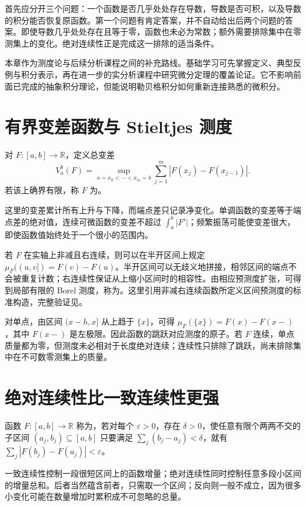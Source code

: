 \documentclass[UTF8,12pt,a4paper,fontset=fandol]{ctexbook}
\begin{document}
首先应分开三个问题：一个函数是否几乎处处存在导数，导数是否可积，以及导数的积分能否恢复原函数。第一个问题有肯定答案，并不自动给出后两个问题的答案。即使导数几乎处处存在且等于零，函数也未必为常数；额外需要排除集中在零测集上的变化。绝对连续性正是完成这一排除的适当条件。

本章作为测度论与后续分析课程之间的补充路线。基础学习可先掌握定义、典型反例与积分表示，再在进一步的实分析课程中研究微分定理的覆盖论证。它不影响前面已完成的抽象积分理论，但能说明勒贝格积分如何重新连接熟悉的微积分。

\section{有界变差函数与 Stieltjes 测度}
\begin{definition}
对 $F:[a,b]\to\mathbb R$，定义总变差
\[
 V_a^b(F)=\sup_{a=x_0<\cdots<x_m=b}
 \sum_{j=1}^{m}|F(x_j)-F(x_{j-1})|.
\]
若该上确界有限，称 $F$ 为。
\end{definition}
这里的变差累计所有上升与下降，而端点差只记录净变化。单调函数的变差等于端点差的绝对值，连续可微函数的变差不超过 $\int_a^b|F'|$；频繁振荡可能使变差很大，即使函数值始终处于一个很小的范围内。

若 $F$ 在实轴上非减且右连续，则可以在半开区间上规定
$\mu_F((u,v])=F(v)-F(u)$。半开区间可以无歧义地拼接，相邻区间的端点不会被重复计数；右连续性保证从上缩小区间时的相容性。由相应预测度扩张，可得到局部有限的 Borel 测度，称为。这里引用非减右连续函数所定义区间预测度的标准构造，完整验证见\cite[第1章]{teschl-ra}。

对单点，由区间 $(x-h,x]$ 从上趋于 $\{x\}$，可得
$\mu_F(\{x\})=F(x)-F(x-)$，其中 $F(x-)$ 是左极限。因此函数的跳跃对应测度的原子。若 $F$ 连续，单点质量都为零，但测度未必相对于长度绝对连续；连续性只排除了跳跃，尚未排除集中在不可数零测集上的质量。

\section{绝对连续性比一致连续性更强}
\begin{definition}
函数 $F:[a,b]\to\mathbb R$ 称为，若对每个 $\varepsilon>0$，存在 $\delta>0$，使任意有限个两两不交的子区间 $(a_j,b_j)\subseteq[a,b]$ 只要满足 $\sum_j(b_j-a_j)<\delta$，就有
$\sum_j|F(b_j)-F(a_j)|<\varepsilon$。
\end{definition}
一致连续性控制一段很短区间上的函数增量；绝对连续性同时控制任意多段小区间的增量总和。后者当然蕴含前者，只需取一个区间；反向则一般不成立，因为很多小变化可能在数量增加时累积成不可忽略的总量。
\end{document}
